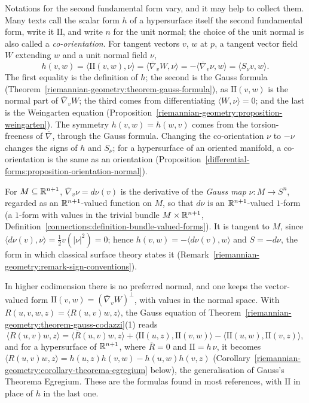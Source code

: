 \begin{remark}\label{riemannian-geometry:remark-second-fundamental-form-notation}
Notations for the second fundamental form vary, and it may help to collect them. Many texts call the scalar form $h$ of a hypersurface itself the second fundamental form, write it $\mathrm{II}$, and
write $n$ for the unit normal; the choice of the unit normal is also called a \emph{co-orientation}. For tangent vectors $v$, $w$ at $p$, a tangent vector field $W$ extending $w$ and a unit normal field $\nu$,
\[
h(v, w) = \langle\mathrm{II}(v, w), \nu\rangle = \langle\overline{\nabla}_vW, \nu\rangle = -\langle\overline{\nabla}_v\nu, w\rangle = \langle S_\nu v, w\rangle .
\]
The first equality is the definition of $h$; the second is the Gauss formula (Theorem~\ref{riemannian-geometry:theorem-gauss-formula}), as $\mathrm{II}(v, w)$ is the normal part of $\overline{\nabla}_vW$; the third comes from
differentiating $\langle W, \nu\rangle = 0$; and the last is the Weingarten equation (Proposition~\ref{riemannian-geometry:proposition-weingarten}). The symmetry $h(v, w) = h(w, v)$ comes from the torsion-freeness of
$\overline{\nabla}$, through the Gauss formula. Changing the co-orientation $\nu$ to $-\nu$ changes the signs of $h$ and $S_\nu$; for a hypersurface of an oriented manifold, a co-orientation is the same as an
orientation (Proposition~\ref{differential-forms:proposition-orientation-normal}).

For $M \subseteq \mathbb{R}^{n+1}$, $\overline{\nabla}_v\nu = d\nu(v)$ is the derivative of the \emph{Gauss map} $\nu \colon M \to S^n$, regarded as an $\mathbb{R}^{n+1}$-valued function on $M$, so that $d\nu$ is an
$\mathbb{R}^{n+1}$-valued $1$-form (a $1$-form with values in the trivial bundle $M \times \mathbb{R}^{n+1}$, Definition~\ref{connections:definition-bundle-valued-forms}). It is tangent to $M$, since
$\langle d\nu(v), \nu\rangle = \frac12v(|\nu|^2) = 0$; hence $h(v, w) = -\langle d\nu(v), w\rangle$ and $S = -d\nu$, the form in which classical surface theory states it
(Remark~\ref{riemannian-geometry:remark-sign-conventions}).

In higher codimension there is no preferred normal, and one keeps the vector-valued form $\mathrm{II}(v, w) = (\overline{\nabla}_vW)^\perp$, with values in the normal space. With $R(u, v, w, z) = \langle R(u, v)w, z\rangle$, the
Gauss equation of Theorem~\ref{riemannian-geometry:theorem-gauss-codazzi}(1) reads
\[
\langle R(u, v)w, z\rangle = \langle\overline{R}(u, v)w, z\rangle + \langle\mathrm{II}(u, z), \mathrm{II}(v, w)\rangle - \langle\mathrm{II}(u, w), \mathrm{II}(v, z)\rangle,
\]
and for a hypersurface of $\mathbb{R}^{n+1}$, where $\overline{R} = 0$ and $\mathrm{II} = h\,\nu$, it becomes $\langle R(u, v)w, z\rangle = h(u, z)h(v, w) - h(u, w)h(v, z)$
(Corollary~\ref{riemannian-geometry:corollary-theorema-egregium} below), the generalisation of Gauss's Theorema Egregium. These are the formulas found in most references, with $\mathrm{II}$ in place of $h$ in the
last one.
\end{remark}

